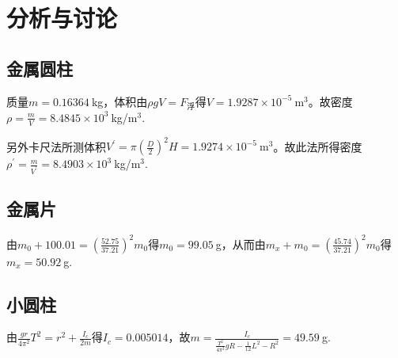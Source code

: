 \documentclass[a4paper]{article}%
\begin{document}
\section{分析与讨论}
\subsection{金属圆柱}
质量$m=0.16364~$kg，体积由$\rho gV=F_\text{浮}$得$V=1.9287\times 10^{-5}~\text{m}^3$。故密度$\rho =\frac{m}{V}=8.4845\times 10^{3}~$kg/m$^3$.

另外卡尺法所测体积$V^\prime=\pi\left(\frac{D}{2}\right)^2H=1.9274\times 10^{-5}~\text{m}^3$。故此法所得密度$\rho^\prime=\frac{m}{V^\prime}=8.4903\times 10^{3}~$kg/m$^3$.
\subsection{金属片}
由$m_0+100.01=\left(\frac{52.75}{37.21}\right)^2m_0$得$m_0=99.05~$g，从而由$m_x+m_0=\left(\frac{45.74}{37.21}\right)^2m_0$得$m_x=50.92~$g.

\subsection{小圆柱}
由$\frac{gr}{4\pi^2}T^2=r^2+\frac{I_c}{2m}$得$I_c=0.005014$，故$m=\frac{I_c}{\frac{T^2}{4\pi^2}gR-\frac{1}{12}L^2-R^2}=49.59~$g.
\end{document}

